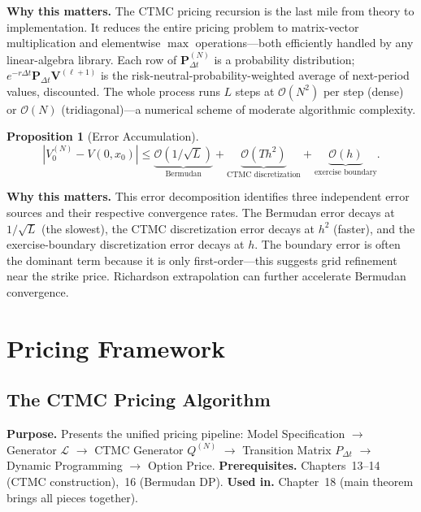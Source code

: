 \documentclass[11pt,a4paper,openany]{book}
\theoremstyle{definition}
\theoremstyle{plain}
\newtheorem{proposition}[theorem]{Proposition}
\theoremstyle{remark}
\newcommand{\1}{\mathbbm{1}}
\begin{document}
\medskip
\noindent\textbf{Why this matters.} The CTMC pricing recursion is the last mile from theory to implementation. It reduces the entire pricing problem to matrix-vector multiplication and elementwise $\max$ operations---both efficiently handled by any linear-algebra library. Each row of $\mathbf{P}_{\Delta t}^{(N)}$ is a probability distribution; $e^{-r\Delta t}\mathbf{P}_{\Delta t} \mathbf{V}^{(\ell+1)}$ is the risk-neutral-probability-weighted average of next-period values, discounted. The whole process runs $L$ steps at $\mathcal{O}(N^2)$ per step (dense) or $\mathcal{O}(N)$ (tridiagonal)---a numerical scheme of moderate algorithmic complexity.

\begin{proposition}[Error Accumulation]
\[
|V_{0}^{(N)} - V(0, x_{0})| \leq \underbrace{\mathcal{O}(1/\sqrt{L})}_{\text{Bermudan}} + \underbrace{\mathcal{O}(T h^{2})}_{\text{CTMC discretization}} + \underbrace{\mathcal{O}(h)}_{\text{exercise boundary}}.
\]
\end{proposition}

\medskip
\noindent\textbf{Why this matters.} This error decomposition identifies three independent error sources and their respective convergence rates. The Bermudan error decays at $1/\sqrt{L}$ (the slowest), the CTMC discretization error decays at $h^2$ (faster), and the exercise-boundary discretization error decays at $h$. The boundary error is often the dominant term because it is only first-order---this suggests grid refinement near the strike price. Richardson extrapolation can further accelerate Bermudan convergence.

\part{Pricing Framework}

\chapter{The CTMC Pricing Algorithm}

\noindent\textbf{Purpose.} Presents the unified pricing pipeline: Model Specification $\to$ Generator $\mathcal{L}$ $\to$ CTMC Generator $Q^{(N)}$ $\to$ Transition Matrix $P_{\Delta t}$ $\to$ Dynamic Programming $\to$ Option Price.
\textbf{Prerequisites.} Chapters~13--14 (CTMC construction),~16 (Bermudan DP).
\textbf{Used in.} Chapter~18 (main theorem brings all pieces together).
\end{document}
